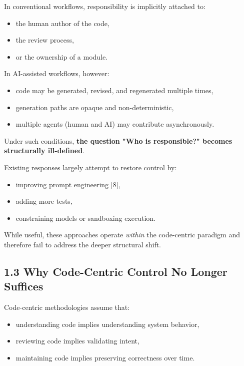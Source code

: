 \documentclass[
]{article}
\begin{document}
In conventional workflows, responsibility is implicitly attached to:

\begin{itemize}
\item
  the human author of the code,
\item
  the review process,
\item
  or the ownership of a module.
\end{itemize}

In AI-assisted workflows, however:

\begin{itemize}
\item
  code may be generated, revised, and regenerated multiple times,
\item
  generation paths are opaque and non-deterministic,
\item
  multiple agents (human and AI) may contribute asynchronously.
\end{itemize}

Under such conditions, \textbf{the question "Who is responsible?"
becomes structurally ill-defined}.

Existing responses largely attempt to restore control by:

\begin{itemize}
\item
  improving prompt engineering {[}8{]},
\item
  adding more tests,
\item
  constraining models or sandboxing execution.
\end{itemize}

While useful, these approaches operate \emph{within} the code-centric
paradigm and therefore fail to address the deeper structural shift.

\hypertarget{13-why-code-centric-control-no-longer-suffices}{%
\subsection{1.3 Why Code-Centric Control No Longer
Suffices}\label{13-why-code-centric-control-no-longer-suffices}}

Code-centric methodologies assume that:

\begin{itemize}
\item
  understanding code implies understanding system behavior,
\item
  reviewing code implies validating intent,
\item
  maintaining code implies preserving correctness over time.
\end{itemize}
\end{document}
